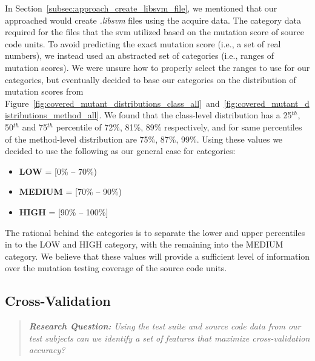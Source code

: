 In Section~\ref{subsec:approach_create_libsvm_file}, we mentioned that our approached would create \emph{.libsvm} files using the acquire data. The category data required for the files that the \gls{svm} utilized based on the mutation score of source code units. To avoid predicting the exact mutation score (i.e., a set of real numbers), we instead used an abstracted set of categories (i.e., ranges of mutation scores). We were unsure how to properly select the ranges to use for our categories, but eventually decided to base our categories on the distribution of mutation scores from Figure~\ref{fig:covered_mutant_distributions_class_all}~and~\ref{fig:covered_mutant_distributions_method_all}. We found that the class-level distribution has a 25$^{th}$, 50$^{th}$ and 75$^{th}$ percentile of 72\%, 81\%, 89\% respectively, and for same percentiles of the method-level distribution are 75\%, 87\%, 99\%. Using these values we decided to use the following as our general case for categories:

\begin{itemize}
  \item \textbf{LOW} = [0\% -- 70\%)
  \item \textbf{MEDIUM} = [70\% -- 90\%)
  \item \textbf{HIGH} = [90\% -- 100\%]
\end{itemize}

The rational behind the categories is to separate the lower and upper percentiles in to the LOW and HIGH category, with the remaining into the MEDIUM category. We believe that these values will provide a sufficient level of information over the mutation testing coverage of the source code units.


\subsection{Cross-Validation}
\label{subsec:experiment_cross_validation}
\begin{quote}
  \emph{\textbf{Research Question:} Using the test suite and source code data from our test subjects can we identify a set of features that maximize cross-validation accuracy?}
\end{quote}

